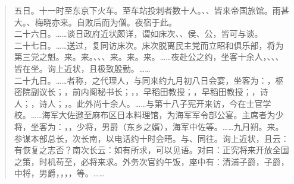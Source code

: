 \begin{quote}
五日。十一时至东京下火车。至车站投刺者数十人。、、皆来帝国旅馆。雨甚大。、梅晓亦来。自败后而为僧。夜宿于此。\\

二十六日。……谈日政府近状颇详，谓如床次、、侯、公，皆可与谈。\\

二十七日。……送过，复同访床次。床次脱离民主党而立昭和俱乐部，将为第三党之魁。来。来。、、、来。来。来。……夜赴公之约，坐客十余人，、、、皆在坐。询上近状，且极致殷勤。……\\

二十九日。……者称，之代理人，与同来约九月初八日会宴，坐客为：，枢密院副议长；，前内阁秘书长；，，早稻田教授；，早稻田教授；，诗人；，诗人；，。此外尚十余人。……与第十八子宪开来访，今在士官学校。……海军大佐邀至麻布区日本料理馆，为海军军令部公宴。主席者为少将，坐客为：，，少将，男爵（东乡之婿），海军中佐等。……九月朔。来。参谋本部总长，次长南，以电话约十时会晤。与、同往。询上近状，且云：有恢复之志否？南次长云：如有所求，可以见语。对曰：正究将来开放全国之策，时机苟至，必将来求。外务次官约午饭，座中有：清浦子爵，子爵，中将，男爵，，，，等。……\\


\end{quote}
